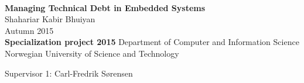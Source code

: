 
\thispagestyle{empty}
\mbox{}\\[6pc]
\begin{center}
\Huge{\textbf{Managing Technical Debt in Embedded Systems}}\\[4pc]
\Large{Shahariar Kabir Bhuiyan}\\[1pc]
\large{Autumn 2015}\\[2pc]

\textbf{Specialization project 2015}
\linebreak
Department of Computer and Information Science\\
Norwegian University of Science and Technology
\end{center}
\vfill

\noindent Supervisor 1: Carl-Fredrik Sørensen

